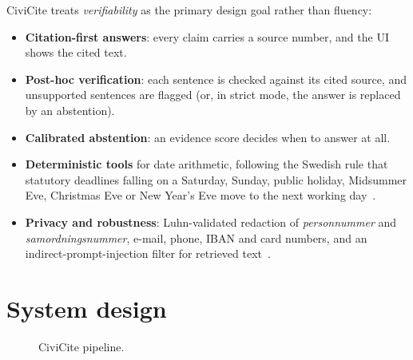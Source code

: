 \documentclass[11pt,a4paper]{article}
\begin{document}
CiviCite treats \emph{verifiability} as the primary design goal rather than fluency:
\begin{itemize}
  \item \textbf{Citation-first answers}: every claim carries a source number, and the UI shows the cited text.
  \item \textbf{Post-hoc verification}: each sentence is checked against its cited source, and unsupported
        sentences are flagged (or, in strict mode, the answer is replaced by an abstention).
  \item \textbf{Calibrated abstention}: an evidence score decides when to answer at all.
  \item \textbf{Deterministic tools} for date arithmetic, following the Swedish rule that statutory deadlines
        falling on a Saturday, Sunday, public holiday, Midsummer Eve, Christmas Eve or New Year's Eve move to
        the next working day~\cite{lag1930}.
  \item \textbf{Privacy and robustness}: Luhn-validated redaction of \emph{personnummer} and
        \emph{samordningsnummer}, e-mail, phone, IBAN and card numbers, and an indirect-prompt-injection
        filter for retrieved text~\cite{greshake}.
\end{itemize}

\section{System design}
\begin{figure}[h]
\centering
{}
\caption{CiviCite pipeline.}
\end{figure}
\end{document}
